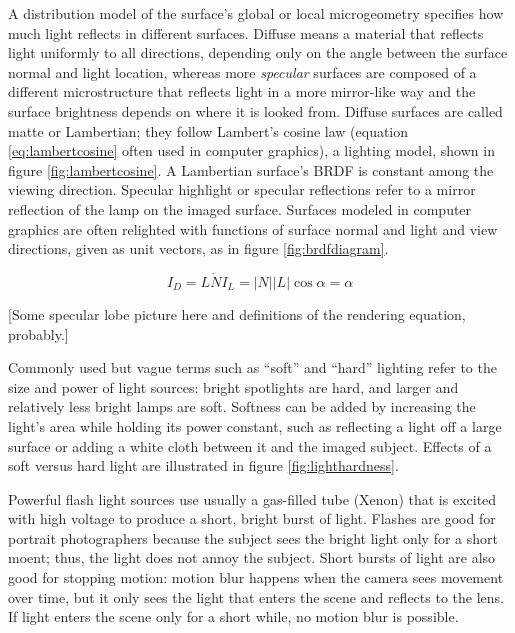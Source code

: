 A distribution model of the surface's global or local microgeometry specifies how much light reflects in different surfaces. \cite{nayar1991surface} %
Diffuse means a material that reflects light uniformly to all directions, depending only on the angle between the surface normal and light location, whereas more \emph{specular} surfaces are composed of a different microstructure that reflects light in a more mirror-like way and the surface brightness depends on where it is looked from.
Diffuse surfaces are called matte or Lambertian; they follow Lambert's cosine law (equation \ref{eq:lambertcosine} often used in computer graphics), a lighting model, shown in figure \ref{fig:lambertcosine}. \cite{lamberttodo}
A Lambertian surface's BRDF is constant among the viewing direction.
Specular highlight or specular reflections refer to a mirror reflection of the lamp on the imaged surface.
Surfaces modeled in computer graphics are often relighted with functions of surface normal and light and view directions, given as unit vectors, as in figure \ref{fig:brdfdiagram}.


\begin{equation} \label{eq:lambertcosine}
	I_D = L \dot N I_L = |N| |L| \cos \alpha = \alpha
\end{equation}

[Some specular lobe picture here and definitions of the rendering equation, probably.]

Commonly used but vague terms such as ``soft'' and ``hard'' lighting refer to the size and power of light sources: bright spotlights are hard, and larger and relatively less bright lamps are soft.
Softness can be added by increasing the light's area while holding its power constant, such as reflecting a light off a large surface or adding a white cloth between it and the imaged subject.
Effects of a soft versus hard light are illustrated in figure \ref{fig:lighthardness}.

Powerful flash light sources use usually a gas-filled tube (Xenon) that is excited with high voltage to produce a short, bright burst of light.
Flashes are good for portrait photographers because the subject sees the bright light only for a short moent; thus, the light does not annoy the subject.
Short bursts of light are also good for stopping motion: motion blur happens when the camera sees movement over time, but it only sees the light that enters the scene and reflects to the lens.
If light enters the scene only for a short while, no motion blur is possible.

